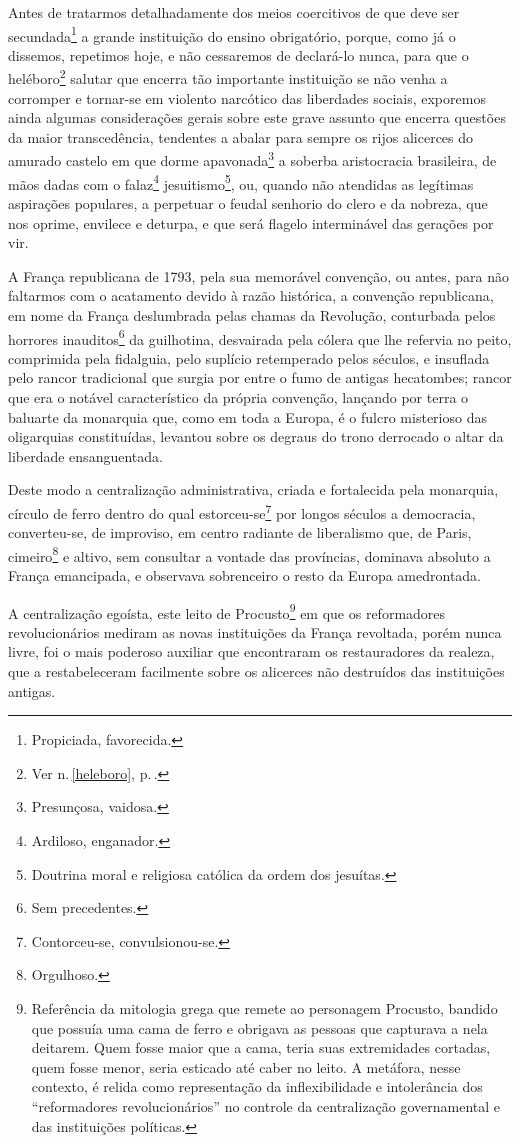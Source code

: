 Antes de tratarmos detalhadamente dos meios coercitivos de que deve ser
secundada\footnote{Propiciada, favorecida.} a grande instituição do
ensino obrigatório, porque, como já o dissemos, repetimos hoje, e não
cessaremos de declará-lo nunca, para que o heléboro\footnote{Ver n.\,\ref{heleboro}, p.\,\pageref{heleboro}.} salutar
que encerra tão importante instituição se não venha a corromper e
tornar-se em violento narcótico das liberdades sociais, exporemos ainda
algumas considerações gerais sobre este grave assunto que encerra
questões da maior transcedência, tendentes a abalar para sempre os rijos
alicerces do amurado castelo em que dorme apavonada\footnote{
  Presunçosa, vaidosa.} a soberba aristocracia brasileira, de mãos dadas
com o falaz\footnote{Ardiloso, enganador.} jesuitismo\footnote{
  Doutrina moral e religiosa católica da ordem dos jesuítas.}, ou,
quando não atendidas as legítimas aspirações populares, a perpetuar o
feudal senhorio do clero e da nobreza, que nos oprime, envilece e
deturpa, e que será flagelo interminável das gerações por vir.

A França republicana de 1793, pela sua memorável convenção, ou antes,
para não faltarmos com o acatamento devido à razão histórica, a
convenção republicana, em nome da França deslumbrada pelas chamas da
Revolução, conturbada pelos horrores inauditos\footnote{Sem
  precedentes.} da guilhotina, desvairada pela cólera que lhe refervia
no peito, comprimida pela fidalguia, pelo suplício retemperado pelos
séculos, e insuflada pelo rancor tradicional que surgia por entre o fumo
de antigas hecatombes; rancor que era o notável característico da
própria convenção, lançando por terra o baluarte da monarquia que, como
em toda a Europa, é o fulcro misterioso das oligarquias constituídas,
levantou sobre os degraus do trono derrocado o altar da liberdade
ensanguentada.

Deste modo a centralização administrativa, criada e fortalecida pela
monarquia, círculo de ferro dentro do qual estorceu-se\footnote{
  Contorceu-se, convulsionou-se.} por longos séculos a democracia,
converteu-se, de improviso, em centro radiante de liberalismo que, de
Paris, cimeiro\footnote{Orgulhoso.} e altivo, sem consultar a vontade
das províncias, dominava absoluto a França emancipada, e observava
sobrenceiro o resto da Europa amedrontada.

A centralização egoísta, este leito de Procusto\footnote{Referência da
  mitologia grega que remete ao personagem Procusto, bandido que possuía
  uma cama de ferro e obrigava as pessoas que capturava a nela deitarem.
  Quem fosse maior que a cama, teria suas extremidades cortadas, quem
  fosse menor, seria esticado até caber no leito. A metáfora, nesse
  contexto, é relida como representação da inflexibilidade e
  intolerância dos ``reformadores revolucionários'' no controle da
  centralização governamental e das instituições políticas.} em que os
reformadores revolucionários mediram as novas instituições da França
revoltada, porém nunca livre, foi o mais poderoso auxiliar que
encontraram os restauradores da realeza, que a restabeleceram facilmente
sobre os alicerces não destruídos das instituições antigas.

